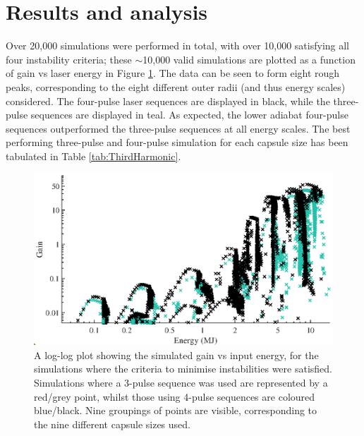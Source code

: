 \section{Results and analysis}

Over 20,000 simulations were performed in total, with over 10,000 satisfying all four instability criteria; these $\sim$10,000 valid simulations are plotted as a function of gain vs laser energy in Figure \ref{fig:loglog}. The data can be seen to form eight rough peaks, corresponding to the eight different outer radii (and thus energy scales) considered. The four-pulse laser sequences are displayed in black, while the three-pulse sequences are displayed in teal. As expected, the lower adiabat four-pulse sequences outperformed the three-pulse sequences at all energy scales. The best performing three-pulse and four-pulse simulation for each capsule size has been tabulated in Table \ref{tab:ThirdHarmonic}. 

\begin{figure}[ht!]
\centering
\includegraphics{figures/LowCR/AllData_full.eps}
\caption{A log-log plot showing the simulated gain vs input energy, for the simulations where the criteria to minimise instabilities were satisfied. Simulations where a 3-pulse sequence was used are represented by a red/grey point, whilst those using 4-pulse sequences are coloured blue/black. Nine groupings of points are visible, corresponding to the nine different capsule sizes used.}
\label{fig:loglog}
\end{figure}


